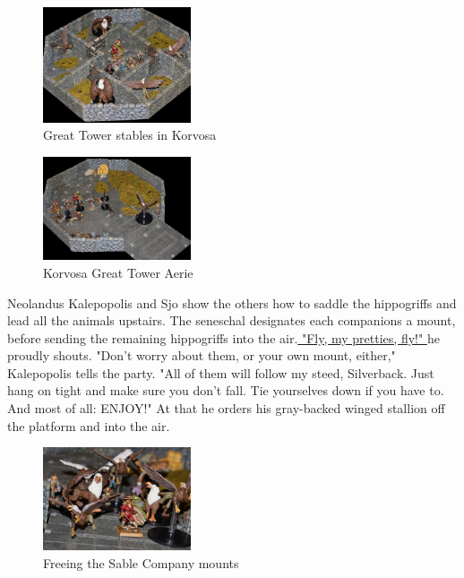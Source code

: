 \begin{figure}[h]
	\centering
	\includegraphics[width=0.39\textwidth]{images/Great-Tower-stables-in-Korvosa-567993978.jpg}
	\caption{Great Tower stables in Korvosa}
	\label{fig:Great-Tower-stables-in-Korvosa-567993978}
\end{figure}

\begin{figure}[h]
	\centering
	\includegraphics[width=0.39\textwidth]{images/Korvosa-Great-Tower-Aerie-567995366.jpg}
	\caption{Korvosa Great Tower Aerie}
	\label{fig:Korvosa-Great-Tower-Aerie-567995366}
\end{figure}

Neolandus Kalepopolis and Sjo show the others how to saddle the hippogriffs and lead all the animals upstairs. The seneschal designates each companions a mount, before sending the remaining hippogriffs into the air.\hyperref[fig:Freeing-the-Sable-Company-mounts-567995944]{ "Fly, my pretties, fly!" } he proudly shouts. "Don't worry about them, or your own mount, either," Kalepopolis tells the party. "All of them will follow my steed, Silverback. Just hang on tight and make sure you don't fall. Tie yourselves down if you have to. And most of all: ENJOY!" At that he orders his gray-backed winged stallion off the platform and into the air. \\

\begin{figure}[h]
	\centering
	\includegraphics[width=0.39\textwidth]{images/Freeing-the-Sable-Company-mounts-567995944.jpg}
	\caption{Freeing the Sable Company mounts}
	\label{fig:Freeing-the-Sable-Company-mounts-567995944}
\end{figure}

